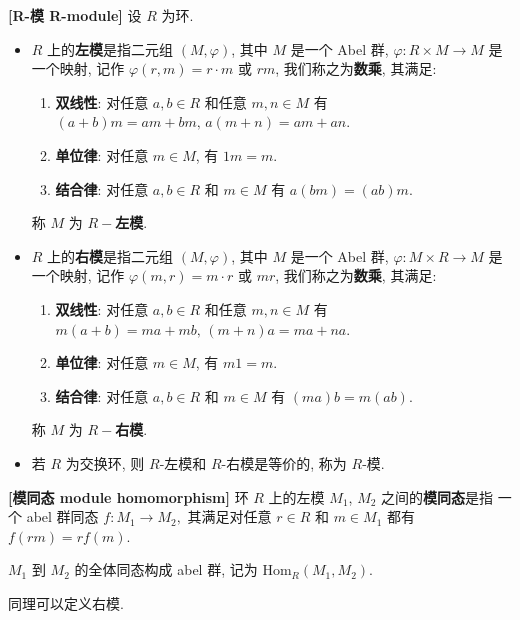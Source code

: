 \documentclass[UTF8]{book}
\begin{document}
\begin{definition}
    \textbf{[R-模 R-module]} 
    设 $R$ 为环. 
    \begin{itemize}
        \item $R$ 上的\textbf{左模}是指二元组 $(M,\varphi)$, 
        其中 $M$ 是一个 Abel 群, $\varphi: R \times M \to M$ 
        是一个映射, 记作 $\varphi(r,m) = r\cdot m$ 或 $rm$, 
        我们称之为\textbf{数乘}, 其满足: 
        \begin{enumerate}
            \item \textbf{双线性}: 对任意 $a,b \in R$ 和任意 $m,n \in M$ 
            有 $(a+b)m = am + bm, \,a(m+n)= am +an$. 
            \item \textbf{单位律}: 对任意 $m\in M$, 有 $1m = m$. 
            \item \textbf{结合律}: 对任意 $a,b \in R$ 和 $m \in M$ 有
            $a(bm)=(ab)m$. 
        \end{enumerate}
        称 $M$ 为 \textbf{$R-$左模}.

        \item $R$ 上的\textbf{右模}是指二元组 $(M,\varphi)$, 
        其中 $M$ 是一个 Abel 群, $\varphi: M \times R \to M$ 
        是一个映射, 记作 $\varphi(m,r) = m\cdot r$ 或 $mr$, 
        我们称之为\textbf{数乘}, 其满足: 
        \begin{enumerate}
            \item \textbf{双线性}: 对任意 $a,b \in R$ 和任意 $m,n \in M$ 
            有 $m(a+b) = ma + mb, \,(m+n)a= ma +na$. 
            \item \textbf{单位律}: 对任意 $m\in M$, 有 $m1 = m$. 
            \item \textbf{结合律}: 对任意 $a,b \in R$ 和 $m \in M$ 有
            $(ma)b=m(ab)$. 
        \end{enumerate}
        称 $M$ 为 \textbf{$R-$右模}.

        \item 若 $R$ 为交换环, 则 $R$-左模和 $R$-右模是等价的, 
        称为 $R$-模. 
    \end{itemize}
\end{definition}

\begin{definition}
    \textbf{[模同态 module homomorphism]} 
    环 $R$ 上的左模 $M_1$, $M_2$ 之间的\textbf{模同态}是指
    一个 abel 群同态 $f: M_1 \to M_2,$ 
    其满足对任意 $r \in R$ 和 $m \in M_1$ 都有 $f(rm)=rf(m)$. 

    $M_1$ 到 $M_2$ 的全体同态构成 abel 群, 记为 $\mathrm{Hom}_R(M_1,M_2)$. 

    同理可以定义右模. 
\end{definition}
\end{document}
